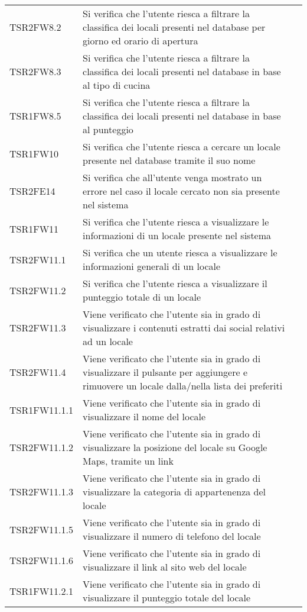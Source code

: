 \begin{longtable}{ m{}<{\centering}  m{}<{\centering}  m{}<{\centering} }
	TSR2FW8.2 & Si verifica che l'utente riesca a filtrare la classifica dei locali presenti nel database per giorno ed orario di apertura & \Su \\
	TSR2FW8.3 & Si verifica che l'utente riesca a filtrare la classifica dei locali presenti nel database in base al tipo di cucina & \Su \\
	TSR1FW8.5 & Si verifica che l'utente riesca a filtrare la classifica dei locali presenti nel database in base al punteggio & \Su \\
	TSR1FW10 & Si verifica che l'utente riesca a cercare un locale presente nel database tramite il suo nome & \Su \\
	TSR2FE14 & Si verifica che all'utente venga mostrato un errore nel caso il locale cercato non sia presente nel sistema & \Su \\
	TSR1FW11 & Si verifica che l'utente riesca a visualizzare le informazioni di un locale presente nel sistema & \Su \\
	TSR2FW11.1 & Si verifica che un utente riesca a visualizzare le informazioni generali di un locale & \Su \\
	TSR2FW11.2 & Si verifica che l'utente riesca a visualizzare il punteggio totale di un locale & \Su \\
	TSR2FW11.3 & Viene verificato che l'utente sia in grado di visualizzare i contenuti estratti dai social relativi ad un locale & \Su \\
	TSR2FW11.4 & Viene verificato che l'utente sia in grado di visualizzare il pulsante per aggiungere e rimuovere un locale dalla/nella lista dei preferiti & \Su \\
	TSR1FW11.1.1 &	Viene verificato che l'utente sia in grado di visualizzare il nome del locale & \Su \\
	TSR2FW11.1.2 & Viene verificato che l'utente sia in grado di visualizzare la posizione del locale su Google Maps, tramite un link & \Su \\
	TSR2FW11.1.3	& Viene verificato che l'utente sia in grado di visualizzare la categoria di appartenenza del locale & \Su \\
	TSR2FW11.1.5	& Viene verificato che l'utente sia in grado di visualizzare il numero di telefono del locale & \Su \\
	TSR2FW11.1.6	& Viene verificato che l'utente sia in grado di visualizzare il link al sito web del locale & \Su \\
	TSR1FW11.2.1	& Viene verificato che l'utente sia in grado di visualizzare il punteggio totale del locale & \Su \\

\end{longtable}
